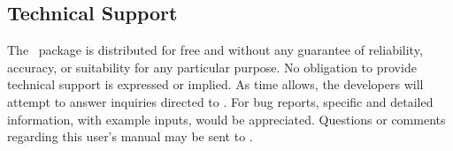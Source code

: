 \subsection{Technical Support} The \PSIfour\ package is
distributed for free and without any guarantee of reliability,
accuracy, or suitability for any particular purpose.  No obligation
to provide technical support is expressed or implied.  As time
allows, the developers will attempt to answer inquiries directed to
.
For bug reports, specific and detailed information, with example
inputs, would be appreciated.  Questions or comments regarding
this user's manual may be sent to .



